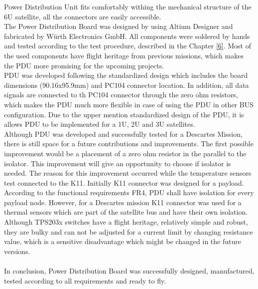 Power Distribution Unit fits comfortably withing the mechanical structure of the 6U satellite, all the connectors are easily accessible. 
\\
The Power Distribution Board was designed by using Altium Designer and fabricated by Würth Electronics GmbH. All components were soldered by hands and tested according to the test procedure, described in the Chapter \ref{6}. Most of the used components have flight heritage from previous missions, which makes the PDU more promising for the upcoming projects.  \\ 
PDU was developed following the standardized design which includes the board dimensions (90.16x95.9mm) and PC104 connector location. In addition, all data signals are connected to th PC104 connector through the zero ohm resistors, which makes the PDU much more flexible in case of using the PDU in other BUS configuration. 
Due to the upper mention standardized design of the PDU, it is allows PDU to be implemented for a 1U, 2U and 3U satellites. \\
Although PDU was developed and successfully tested for a Descartes Mission, there is still space for a future contributions and improvements. The first possible improvement would be a placement of a zero ohm resistor in the parallel to the isolator. This improvement will give an opportunity to choose if isolator is needed. The reason for this improvement occurred while the temperature sensors test connected to the K11. Initially K11 connector was designed for a payload. According to the functional requirements FR4, PDU shall have isolation for every payload node. However, for a Descartes mission K11 connector was used for a thermal sensors which are part of the satellite bus and have their own isolation. Although TPS203x switches have a flight heritage, relatively simple and robust, they are bulky and can not be adjusted for a current limit by changing resistance value, which is a sensitive disadvantage which might be changed in the future versions.  \\ \\

In conclusion, Power Distribution Board was successfully designed,  manufactured, tested according to all requirements and ready to fly. 

